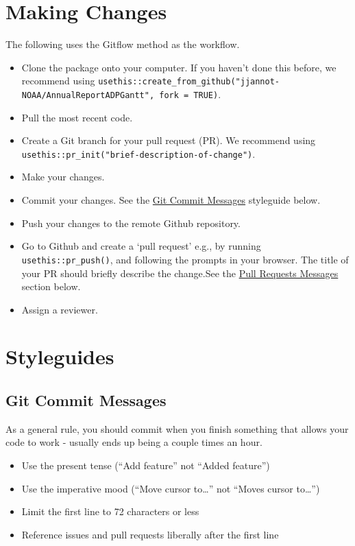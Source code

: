 \documentclass[
  letterpaper,
  DIV=11,
  numbers=noendperiod]{scrreprt}
\providecommand{\tightlist}{%
  \setlength{\itemsep}{0pt}\setlength{\parskip}{0pt}}\usepackage{longtable,booktabs,array}
\begin{document}
\section{Making Changes}\label{making-changes}

The following uses the Gitflow method as the workflow.

\begin{itemize}
\tightlist
\item
  Clone the package onto your computer. If you haven't done this before,
  we recommend using
  \texttt{usethis::create\_from\_github("jjannot-NOAA/AnnualReportADPGantt",\ fork\ =\ TRUE)}.
\item
  Pull the most recent code.
\item
  Create a Git branch for your pull request (PR). We recommend using
  \texttt{usethis::pr\_init("brief-description-of-change")}.
\item
  Make your changes.
\item
  Commit your changes. See the \hyperref[git-commit-messages]{Git Commit
  Messages} styleguide below.
\item
  Push your changes to the remote Github repository.
\item
  Go to Github and create a `pull request' e.g., by running
  \texttt{usethis::pr\_push()}, and following the prompts in your
  browser. The title of your PR should briefly describe the change.See
  the \hyperref[pull-requests-messages]{Pull Requests Messages} section
  below.
\item
  Assign a reviewer.
\end{itemize}

\section{Styleguides}\label{styleguides}

\subsection{Git Commit Messages}\label{git-commit-messages}

As a general rule, you should commit when you finish something that
allows your code to work - usually ends up being a couple times an hour.

\begin{itemize}
\tightlist
\item
  Use the present tense (``Add feature'' not ``Added feature'')
\item
  Use the imperative mood (``Move cursor to\ldots{}'' not ``Moves cursor
  to\ldots{}'')
\item
  Limit the first line to 72 characters or less
\item
  Reference issues and pull requests liberally after the first line
\end{itemize}
\end{document}
